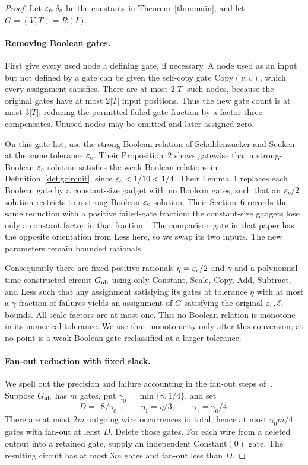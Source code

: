\begin{proof}
Let $\varepsilon_c,\delta_c$ be the constants in Theorem~\ref{thm:main}, and
let $G=(V,T)=R(I)$.

\paragraph{Removing Boolean gates.}
First give every used node a defining gate, if necessary. A node used as
an input but not defined by a gate can be given the self-copy gate
$\mathrm{Copy}(v;v)$, which every assignment satisfies. There are at
most $2|T|$ such nodes, because the original gates have at most $2|T|$
input positions. Thus the new gate count is at most $3|T|$; reducing
the permitted failed-gate fraction by a factor three compensates.
Unused nodes may be omitted and later assigned zero.

On this gate list, use the strong-Boolean relation of Schuldenzucker
and Seuken at the same tolerance $\varepsilon_c$. Their Proposition~2 shows
gatewise that a strong-Boolean $\varepsilon_c$ solution satisfies the
weak-Boolean relations in Definition~\ref{def:gcircuit}, since
$\varepsilon_c<1/10<1/4$. Their Lemma~1 replaces each Boolean gate by a
constant-size gadget with no Boolean gates, such that an
$\varepsilon_c/2$ solution restricts to a strong-Boolean $\varepsilon_c$ solution.
Their Section~6 records the same reduction with a positive failed-gate
fraction: the constant-size gadgets lose only a constant factor in
that fraction~\cite[Proposition~2, Lemma~1, and Section~6]{SchuldenzuckerSeuken2019}.
The comparison gate in that paper has the opposite orientation from
$\mathrm{Less}$ here, so we swap its two inputs. The new parameters
remain bounded rationals.

Consequently there are fixed positive rationals
$\eta=\varepsilon_c/2$ and $\gamma$ and a polynomial-time constructed circuit
$G_{\rm nb}$ using only Constant, Scale, Copy, Add, Subtract, and Less
such that any assignment satisfying its gates at tolerance $\eta$ with
at most a $\gamma$ fraction of failures yields an assignment of $G$
satisfying the original $\varepsilon_c,\delta_c$ bounds. All scale factors
are at most one. This no-Boolean relation is monotone in its numerical
tolerance. We use that monotonicity only after this conversion; at no
point is a weak-Boolean gate reclassified at a larger tolerance.

\paragraph{Fan-out reduction with fixed slack.}
We spell out the precision and failure accounting in the fan-out
steps of~\cite[proof of Theorem~2, pp.~4--5]{BPR2016}.
Suppose $G_{\rm nb}$ has $m$ gates, put
$\gamma_0=\min\{\gamma,1/4\}$, and set
\[
 D=\lceil 8/\gamma_0\rceil,\qquad
 \eta_1=\eta/3,\qquad \gamma_1=\gamma_0/4.
\]
There are at most $2m$ outgoing wire occurrences in total, hence at
most $\gamma_0m/4$ gates with fan-out at least $D$. Delete those gates.
For each wire from a deleted output into a retained gate, supply an
independent $\mathrm{Constant}(0)$ gate. The resulting circuit has
at most $3m$ gates and fan-out less than $D$.


\end{proof}
